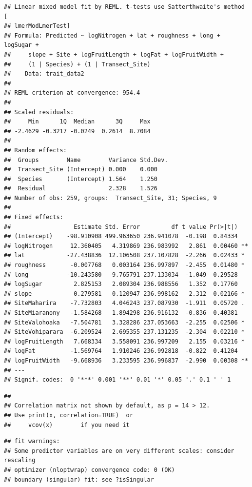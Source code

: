 \documentclass[
  12pt,
]{article}
\begin{document}
\begin{verbatim}
## Linear mixed model fit by REML. t-tests use Satterthwaite's method [
## lmerModLmerTest]
## Formula: Predicted ~ logNitrogen + lat + roughness + long + logSugar +  
##     slope + Site + logFruitLength + logFat + logFruitWidth +  
##     (1 | Species) + (1 | Transect_Site)
##    Data: trait_data2
## 
## REML criterion at convergence: 954.4
## 
## Scaled residuals: 
##     Min      1Q  Median      3Q     Max 
## -2.4629 -0.3217 -0.0249  0.2614  8.7084 
## 
## Random effects:
##  Groups        Name        Variance Std.Dev.
##  Transect_Site (Intercept) 0.000    0.000   
##  Species       (Intercept) 1.564    1.250   
##  Residual                  2.328    1.526   
## Number of obs: 259, groups:  Transect_Site, 31; Species, 9
## 
## Fixed effects:
##                  Estimate Std. Error         df t value Pr(>|t|)   
## (Intercept)    -98.910908 499.963650 236.941078  -0.198  0.84334   
## logNitrogen     12.360405   4.319869 236.983992   2.861  0.00460 **
## lat            -27.438836  12.106508 237.107828  -2.266  0.02433 * 
## roughness       -0.007768   0.003164 236.997897  -2.455  0.01480 * 
## long           -10.243580   9.765791 237.133034  -1.049  0.29528   
## logSugar         2.825153   2.089304 236.988556   1.352  0.17760   
## slope            0.279581   0.120947 236.998162   2.312  0.02166 * 
## SiteMaharira    -7.732803   4.046243 237.087930  -1.911  0.05720 . 
## SiteMiaranony   -1.584268   1.894298 236.916132  -0.836  0.40381   
## SiteValohoaka   -7.504781   3.328286 237.053663  -2.255  0.02506 * 
## SiteVohiparara  -6.209524   2.695355 237.131235  -2.304  0.02210 * 
## logFruitLength   7.668334   3.558091 236.997209   2.155  0.03216 * 
## logFat          -1.569764   1.910246 236.992818  -0.822  0.41204   
## logFruitWidth   -9.668936   3.233595 236.996837  -2.990  0.00308 **
## ---
## Signif. codes:  0 '***' 0.001 '**' 0.01 '*' 0.05 '.' 0.1 ' ' 1
\end{verbatim}

\begin{verbatim}
## 
## Correlation matrix not shown by default, as p = 14 > 12.
## Use print(x, correlation=TRUE)  or
##     vcov(x)        if you need it
\end{verbatim}

\begin{verbatim}
## fit warnings:
## Some predictor variables are on very different scales: consider rescaling
## optimizer (nloptwrap) convergence code: 0 (OK)
## boundary (singular) fit: see ?isSingular
\end{verbatim}
\end{document}
